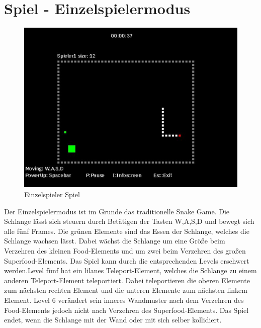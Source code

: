 \section{Spiel - Einzelspielermodus}
\label{Spiel_-_Einzelspielermodus}
%
\begin{figure}[h]
 \centering
 \includegraphics[scale=0.5]{bilder/Einzelspielermodus}
 \caption{Einzelspieler Spiel}
 \label{fig:einzelspielermodus}
\end{figure}
	Der Einzelspielermodus ist im Grunde das traditionelle Snake Game. Die Schlange l{\"a}sst sich steuern durch Bet{\"a}tigen der Tasten W,A,S,D und bewegt sich alle f{\"u}nf Frames. Die gr{\"u}nen Elemente sind das Essen der Schlange, welches die Schlange wachsen l{\"a}sst. Dabei w{\"a}chst die Schlange um eine Gr{\"o}{\ss}e beim Verzehren des kleinen Food-Elements und um zwei beim Verzehren des gro{\ss}en Superfood-Elements.
	Das Spiel kann durch die entsprechenden Levels erschwert werden.Level f{\"u}nf hat ein lilanes Teleport-Element, welches die Schlange zu einem anderen Teleport-Element teleportiert. Dabei teleportieren die oberen Elemente zum n{\"a}chsten rechten Element und die unteren Elemente zum n{\"a}chsten linkem Element. Level 6 ver{\"a}ndert sein inneres Wandmuster nach dem Verzehren des Food-Elements jedoch nicht nach Verzehren des Superfood-Elements. Das Spiel endet, wenn die Schlange mit der Wand oder mit sich selber kollidiert.   



